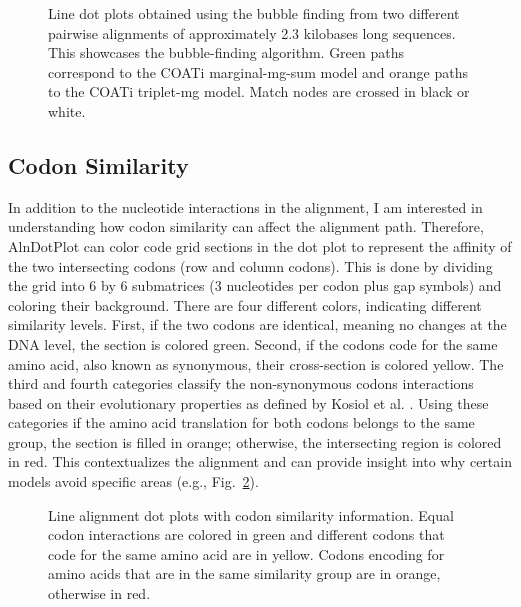 \begin{figure}[!ht]
 \centering
 \scalebox{0.8}{}
 \vspace{0.5em}

 \scalebox{0.6}{}
 \vspace{0.5em}

 \scalebox{0.52}{}
 \caption[Bubble Finding Plots]{Line dot plots obtained using the bubble finding from two different pairwise alignments of approximately 2.3 kilobases long sequences. This showcases the bubble-finding algorithm. Green paths correspond to the COATi marginal-mg-sum model and orange paths to the COATi triplet-mg model. Match nodes are crossed in black or white.}
 \label{fig:bubble-examples}
\end{figure}

\clearpage

\subsection{Codon Similarity}

In addition to the nucleotide interactions in the alignment, I am interested in understanding how codon similarity can affect the alignment path. Therefore, \mbox{AlnDotPlot} can color code grid sections in the dot plot to represent the affinity of the two intersecting codons (row and column codons). This is done by dividing the grid into 6 by 6 submatrices (3 nucleotides per codon plus gap symbols) and coloring their background. There are four different colors, indicating different similarity levels. First, if the two codons are identical, meaning no changes at the DNA level, the section is colored green. Second, if the codons code for the same amino acid, also known as synonymous, their cross-section is colored yellow. The third and fourth categories classify the non-synonymous codons interactions based on their evolutionary properties as defined by Kosiol et al. \citeyearpar{kosiol_ECM_2007}. Using these categories if the amino acid translation for both codons belongs to the same group, the section is filled in orange; otherwise, the intersecting region is colored in red. This contextualizes the alignment and can provide insight into why certain models avoid specific areas (e.g., Fig.~\ref{fig:codon-similarity}).

\begin{figure}[!ht]
 \centering
 \scalebox{0.8}{}
 \vspace{0.5em}

 \scalebox{0.6}{}
 \vspace{0.5em}

 \scalebox{0.52}{}
 \caption[Codon Similarity Dot Plot]{Line alignment dot plots with codon similarity information. Equal codon interactions are colored in green and different codons that code for the same amino acid are in yellow. Codons encoding for amino acids that are in the same similarity group are in orange, otherwise in red.}
 \label{fig:codon-similarity}
\end{figure}

